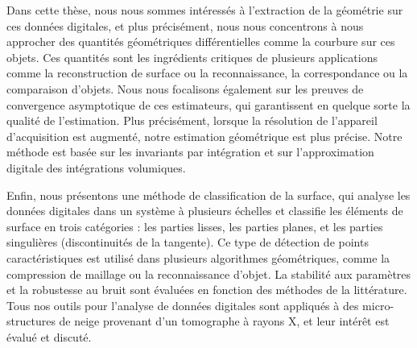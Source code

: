 Dans cette thèse, nous nous sommes intéressés à l'extraction de la géométrie sur
ces données digitales, et plus précisément, nous nous concentrons à nous
approcher des quantités géométriques différentielles comme la courbure sur ces
objets. Ces quantités sont les ingrédients critiques de plusieurs applications
comme la reconstruction de surface ou la reconnaissance, la correspondance ou la
comparaison d'objets. Nous nous focalisons également sur les preuves de
convergence asymptotique de ces estimateurs, qui garantissent en quelque sorte
la qualité de l'estimation. Plus précisément, lorsque la résolution de
l'appareil d'acquisition est augmenté, notre estimation géométrique est plus
précise. Notre méthode est basée sur les invariants par intégration et sur
l'approximation digitale des intégrations volumiques.

Enfin, nous présentons une méthode de classification de la surface, qui analyse
les données digitales dans un système à plusieurs échelles et classifie les
éléments de surface en trois catégories : les parties lisses, les parties
planes, et les parties singulières (discontinuités de la tangente). Ce type de
détection de points caractéristiques est utilisé dans plusieurs algorithmes
géométriques, comme la compression de maillage ou la reconnaissance d'objet. La
stabilité aux paramètres et la robustesse au bruit sont évaluées en fonction des
méthodes de la littérature. Tous nos outils pour l'analyse de données digitales
sont appliqués à des micro-structures de neige provenant d'un tomographe à
rayons X, et leur intérêt est évalué et discuté.
